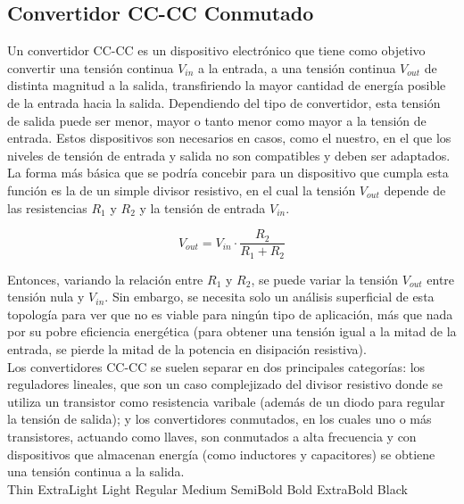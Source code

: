 \subsection{Convertidor CC-CC Conmutado}

Un convertidor CC-CC es un dispositivo electrónico que tiene como objetivo convertir una tensión continua $V_{in}$ a la entrada, a una tensión continua $V_{out}$ de distinta magnitud a la salida, transfiriendo la mayor cantidad de energía posible de la entrada hacia la salida. Dependiendo del tipo de convertidor, esta tensión de salida puede ser menor, mayor o tanto menor como mayor a la tensión de entrada. Estos dispositivos son necesarios en casos, como el nuestro, en el que los niveles de tensión de entrada y salida no son compatibles y deben ser adaptados.\\

La forma más básica que se podría concebir para un dispositivo que cumpla esta función es la de un simple divisor resistivo, en el cual la tensión $V_{out}$ depende de las resistencias $R_1$ y $R_2$ y la tensión de entrada $V_{in}$.

\begin{equation*}
    V_{out} = V_{in}\cdot\frac{R_2}{R_1+R_2}
\end{equation*}

Entonces, variando la relación entre $R_1$ y $R_2$, se puede variar la tensión $V_{out}$ entre tensión nula y $V_{in}$. Sin embargo, se necesita solo un análisis superficial de esta topología para ver que no es viable para ningún tipo de aplicación, más que nada por su pobre eficiencia energética (para obtener una tensión igual a la mitad de la entrada, se pierde la mitad de la potencia en disipación resistiva).\\

Los convertidores CC-CC se suelen separar en dos principales categorías: los {\Medium reguladores lineales}, que son un caso complejizado del divisor resistivo donde se utiliza un transistor como resistencia varibale (además de un diodo para regular la tensión de salida); y los {\Medium convertidores conmutados}, en los cuales uno o más transistores, actuando como llaves, son conmutados a alta frecuencia y con dispositivos que almacenan energía (como inductores y capacitores) se obtiene una tensión continua a la salida.\\

{\Thin Thin} {\ExtraLight ExtraLight} {\Light Light} Regular {\Medium Medium}  {\SemiBold SemiBold} {\Bold Bold} {\ExtraBold ExtraBold} {\Black Black}